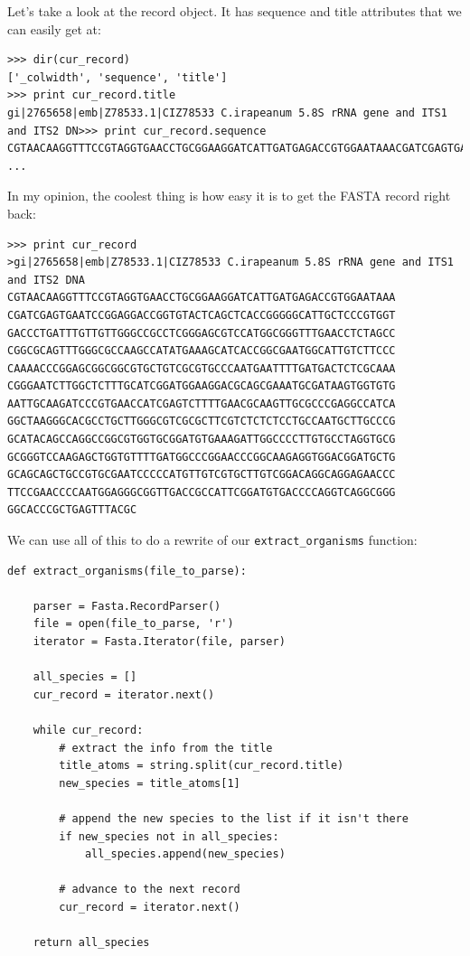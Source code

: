 \documentclass{article}
\begin{document}
Let's take a look at the record object. It has sequence and title attributes that we can easily get at:

\begin{verbatim}
>>> dir(cur_record)
['_colwidth', 'sequence', 'title']
>>> print cur_record.title
gi|2765658|emb|Z78533.1|CIZ78533 C.irapeanum 5.8S rRNA gene and ITS1 and ITS2 DN>>> print cur_record.sequence
CGTAACAAGGTTTCCGTAGGTGAACCTGCGGAAGGATCATTGATGAGACCGTGGAATAAACGATCGAGTGAATCCGGA
...
\end{verbatim}

In my opinion, the coolest thing is how easy it is to get the FASTA record right back:

\begin{verbatim}
>>> print cur_record
>gi|2765658|emb|Z78533.1|CIZ78533 C.irapeanum 5.8S rRNA gene and ITS1 and ITS2 DNA
CGTAACAAGGTTTCCGTAGGTGAACCTGCGGAAGGATCATTGATGAGACCGTGGAATAAA
CGATCGAGTGAATCCGGAGGACCGGTGTACTCAGCTCACCGGGGGCATTGCTCCCGTGGT
GACCCTGATTTGTTGTTGGGCCGCCTCGGGAGCGTCCATGGCGGGTTTGAACCTCTAGCC
CGGCGCAGTTTGGGCGCCAAGCCATATGAAAGCATCACCGGCGAATGGCATTGTCTTCCC
CAAAACCCGGAGCGGCGGCGTGCTGTCGCGTGCCCAATGAATTTTGATGACTCTCGCAAA
CGGGAATCTTGGCTCTTTGCATCGGATGGAAGGACGCAGCGAAATGCGATAAGTGGTGTG
AATTGCAAGATCCCGTGAACCATCGAGTCTTTTGAACGCAAGTTGCGCCCGAGGCCATCA
GGCTAAGGGCACGCCTGCTTGGGCGTCGCGCTTCGTCTCTCTCCTGCCAATGCTTGCCCG
GCATACAGCCAGGCCGGCGTGGTGCGGATGTGAAAGATTGGCCCCTTGTGCCTAGGTGCG
GCGGGTCCAAGAGCTGGTGTTTTGATGGCCCGGAACCCGGCAAGAGGTGGACGGATGCTG
GCAGCAGCTGCCGTGCGAATCCCCCATGTTGTCGTGCTTGTCGGACAGGCAGGAGAACCC
TTCCGAACCCCAATGGAGGGCGGTTGACCGCCATTCGGATGTGACCCCAGGTCAGGCGGG
GGCACCCGCTGAGTTTACGC
\end{verbatim}

We can use all of this to do a rewrite of our \verb|extract_organisms| function:

\begin{verbatim}
def extract_organisms(file_to_parse):

    parser = Fasta.RecordParser()
    file = open(file_to_parse, 'r')
    iterator = Fasta.Iterator(file, parser)

    all_species = []
    cur_record = iterator.next()

    while cur_record:
        # extract the info from the title
        title_atoms = string.split(cur_record.title)
        new_species = title_atoms[1]

        # append the new species to the list if it isn't there
        if new_species not in all_species:
            all_species.append(new_species)

        # advance to the next record
        cur_record = iterator.next()

    return all_species
\end{verbatim}
\end{document}
